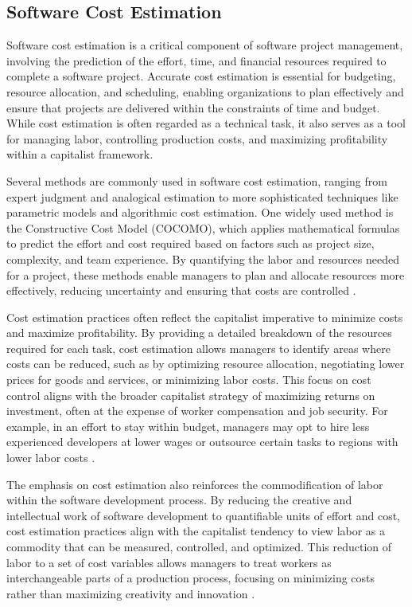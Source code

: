 \begin{refsection}
\subsection{Software Cost Estimation}

Software cost estimation is a critical component of software project management, involving the prediction of the effort, time, and financial resources required to complete a software project. Accurate cost estimation is essential for budgeting, resource allocation, and scheduling, enabling organizations to plan effectively and ensure that projects are delivered within the constraints of time and budget. While cost estimation is often regarded as a technical task, it also serves as a tool for managing labor, controlling production costs, and maximizing profitability within a capitalist framework.

Several methods are commonly used in software cost estimation, ranging from expert judgment and analogical estimation to more sophisticated techniques like parametric models and algorithmic cost estimation. One widely used method is the Constructive Cost Model (COCOMO), which applies mathematical formulas to predict the effort and cost required based on factors such as project size, complexity, and team experience. By quantifying the labor and resources needed for a project, these methods enable managers to plan and allocate resources more effectively, reducing uncertainty and ensuring that costs are controlled \cite[pp.~315-318]{Boehm2000SoftwareCostEstimation}.

Cost estimation practices often reflect the capitalist imperative to minimize costs and maximize profitability. By providing a detailed breakdown of the resources required for each task, cost estimation allows managers to identify areas where costs can be reduced, such as by optimizing resource allocation, negotiating lower prices for goods and services, or minimizing labor costs. This focus on cost control aligns with the broader capitalist strategy of maximizing returns on investment, often at the expense of worker compensation and job security. For example, in an effort to stay within budget, managers may opt to hire less experienced developers at lower wages or outsource certain tasks to regions with lower labor costs \cite[pp.~89-91]{Jones2007EstimatingSoftwareCosts}.

The emphasis on cost estimation also reinforces the commodification of labor within the software development process. By reducing the creative and intellectual work of software development to quantifiable units of effort and cost, cost estimation practices align with the capitalist tendency to view labor as a commodity that can be measured, controlled, and optimized. This reduction of labor to a set of cost variables allows managers to treat workers as interchangeable parts of a production process, focusing on minimizing costs rather than maximizing creativity and innovation \cite[pp.~54-56]{Edwards1980ContestedTerrain}.


\end{refsection}

